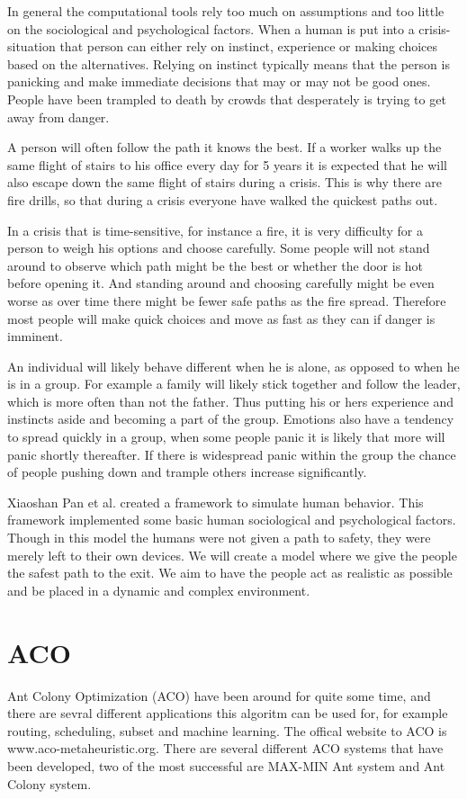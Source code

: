 In general the computational tools rely too much on assumptions and too little on the sociological and psychological  
factors. When a human is put into a crisis-situation that person can either rely on instinct, experience or making  
choices based on the alternatives. Relying on instinct typically means that the person is panicking and make immediate  
decisions that may or may not be good ones. People have been trampled to death by crowds that desperately is trying  
to get away from danger. 
 
A person will often follow the path it knows the best. If a worker walks up the same flight of stairs to his office  
every day for 5 years it is expected that he will also escape down the same flight of stairs during a crisis. This  
is why there are fire drills, so that during a crisis everyone have walked the quickest paths out. 
 
In a crisis that is time-sensitive, for instance a fire, it is very difficulty for a person to weigh his options and  
choose carefully. Some people will not stand around to observe which path might be the best or whether the  
door is hot before opening it. And standing around and choosing carefully might be even worse as  
over time there might be fewer safe paths as the fire spread. Therefore most people will make quick choices 
and move as fast as they can if danger is imminent. 
 
An individual will likely behave different when he is alone, as opposed to when he is in a group. For example  
a family will likely stick together and follow the leader, which is more often than not the father. Thus putting  
his or hers experience and instincts aside and becoming a part of the group. Emotions also have a tendency  
to spread quickly in a group, when some people panic it is likely that more will panic shortly thereafter. If  
there is widespread panic within the group the chance of people pushing down and trample others increase  
significantly. 
 
Xiaoshan Pan et al. created a framework to simulate human behavior. This framework implemented some 
basic human sociological and psychological factors. Though in this model the humans were not given a path 
to safety, they were merely left to their own devices. We will create a model where we give the people the 
safest path to the exit. We aim to have the people act as realistic as possible and be placed in a dynamic 
and complex environment.
 
 
\section{ACO}
Ant Colony Optimization (ACO) have been around for quite some time, and there are sevral different applications this algoritm can be used for, for example routing, scheduling, subset and machine learning. The offical website to ACO is www.aco-metaheuristic.org. There are several different ACO systems that have been developed, two of the most successful are MAX-MIN Ant system and Ant Colony system.

